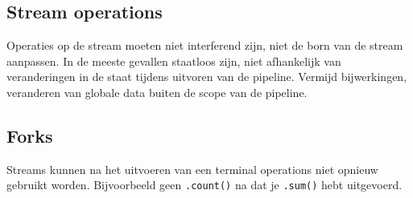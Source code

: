 \subsection{Stream operations}
Operaties op de stream moeten niet interferend zijn, niet de born van de stream aanpassen.
In de meeste gevallen staatloos zijn, niet afhankelijk van veranderingen in de staat tijdens uitvoren van de pipeline.
Vermijd bijwerkingen, veranderen van globale data buiten de scope van de pipeline.

\subsection{Forks}
Streams kunnen na het uitvoeren van een terminal operations niet opnieuw gebruikt worden.
Bijvoorbeeld geen \texttt{.count()} na dat je \texttt{.sum()} hebt uitgevoerd.
